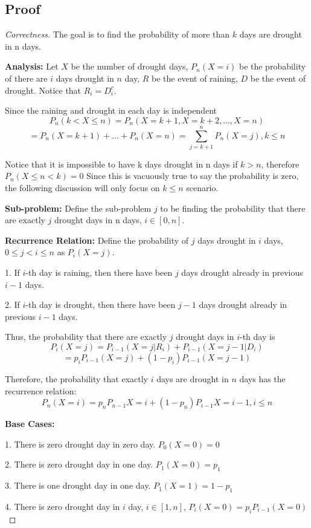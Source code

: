 \documentclass[openany]{article}
\begin{document}
\subsection*{Proof}
\begin{proof}[Correctness]{}
The goal is to find the probability of more than $k$ days are drought in n days.

\textbf{Analysis:} Let $X$ be the number of drought days, $P_n(X=i)$ be the probability of there are $i$ days drought in $n$ day, $R$ be the event of raining, $D$ be the event of drought. Notice that $R_i=D_i^c$.

Since the raining and drought in each day is independent \[P_n(k<X\leq n) = P_n(X=k+1, X=k+2, ..., X= n)\] \[= P_n(X=k+1) + ... + P_n(X=n) = \sum_{j=k+1}^{n}P_n(X=j), k \leq n\]

Notice that it is impossible to have k days drought in n days if $k>n$, therefore $P_n(X\leq n < k) = 0$ Since this is vacuously true to say the probability is zero, the following discussion will only focus on $k\leq n$ scenario.

\textbf{Sub-problem:} Define the sub-problem $j$ to be finding the probability that there are exactly $j$ drought days in n days, $i\in[0,n]$.
    
\textbf{Recurrence Relation:} Define the probability of $j$ days drought in $i$ days,  $0\leq j<i\leq n$ as $P_i(X=j)$.

1. If $i$-th day is raining, then there have been $j$ days drought already in previous $i-1$ days.

2. If $i$-th day is drought, then there have been $j-1$ days drought already in previous $i-1$ days.

Thus, the probability that there are exactly $j$ drought days in $i$-th day is \[P_i(X=j) = P_{i-1}(X=j|R_i) + P_{i-1}(X=j-1|D_i)\]
\[=p_i P_{i-1}(X=j) + (1-p_i)P_{i-1}(X=j-1)\]

Therefore, the probability that exactly $i$ days are drought in $n$ days has the recurrence relation:
\[P_n(X=i) = p_n P_{n-1}{X=i} + (1-p_n)P_{i-1}{X=i-1}, i\leq n\]
    
    
\textbf{Base Cases:}

1. There is zero drought day in zero day. $P_0(X=0)=0$

2. There is zero drought day in one day. $P_1(X=0)=p_1$

3. There is one drought day in one day. $P_1(X=1)=1-p_1$

4. There is zero drought day in $i$ day, $i\in[1,n]$, $P_i(X=0)=p_i P_{i-1}(X=0)$


\end{proof}
\end{document}
